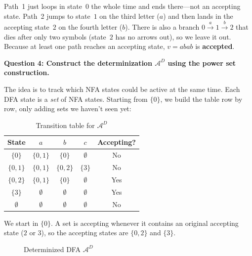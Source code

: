 \documentclass{article}
\theoremstyle{theorem}
\theoremstyle{definition}
\theoremstyle{remark}
\begin{document}
Path~1 just loops in state~$0$ the whole time and ends there---not an accepting state. Path~2 jumps to state~$1$ on the third letter ($a$) and then lands in the accepting state~$2$ on the fourth letter ($b$). There is also a branch $0 \xrightarrow{a} 1 \xrightarrow{b} 2$ that dies after only two symbols (state~$2$ has no arrows out), so we leave it out. Because at least one path reaches an accepting state, $v = abab$ is \textbf{accepted}.

\textbf{Question 4: Construct the determinization $\mathcal{A}^D$ using the power set construction.}

The idea is to track which NFA states could be active at the same time. Each DFA state is a \emph{set} of NFA states. Starting from $\{0\}$, we build the table row by row, only adding sets we haven't seen yet:

\begin{table}[H]
  \centering
  \renewcommand{\arraystretch}{1.2}
  \begin{tabular}{|c|c|c|c|c|}
    \hline
    State & $a$ & $b$ & $c$ & Accepting? \\ \hline
    $\{0\}$ & $\{0,1\}$ & $\{0\}$ & $\emptyset$ & No \\ \hline
    $\{0,1\}$ & $\{0,1\}$ & $\{0,2\}$ & $\{3\}$ & No \\ \hline
    $\{0,2\}$ & $\{0,1\}$ & $\{0\}$ & $\emptyset$ & Yes \\ \hline
    $\{3\}$ & $\emptyset$ & $\emptyset$ & $\emptyset$ & Yes \\ \hline
    $\emptyset$ & $\emptyset$ & $\emptyset$ & $\emptyset$ & No \\ \hline
  \end{tabular}
  \caption{Transition table for $\mathcal{A}^D$}
\end{table}

We start in $\{0\}$. A set is accepting whenever it contains an original accepting state ($2$ or $3$), so the accepting states are $\{0,2\}$ and $\{3\}$.

\begin{figure}[H]
  \centering
  \caption{Determinized DFA $\mathcal{A}^D$}
\end{figure}
\end{document}
